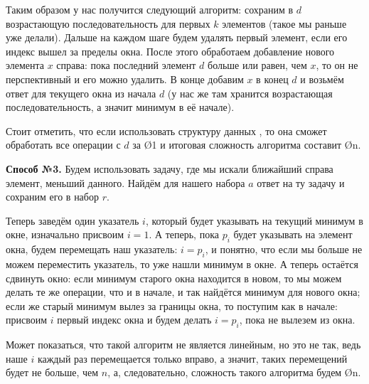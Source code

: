 Таким образом у нас получится следующий алгоритм: сохраним в $d$ возрастающую последовательность для первых $k$ элементов (такое мы раньше уже делали). Дальше на каждом шаге будем удалять первый элемент, если его индекс вышел за пределы окна. После этого обработаем добавление нового элемента $x$ справа: пока последний элемент $d$ больше или равен, чем $x$, то он не перспективный и его можно удалить. В конце добавим $x$ в конец $d$ и возьмём ответ для текущего окна из начала $d$ (у нас же там хранится возрастающая последовательность, а значит минимум в её начале).

Стоит отметить, что если использовать структуру данных , то она сможет обработать все операции с $d$ за \O{1} и итоговая сложность алгоритма составит \O{n}.

\textbf{Способ №3.} Будем использовать задачу, где мы искали ближайший справа элемент, меньший данного. Найдём для нашего набора $a$ ответ на ту задачу и сохраним его в набор $r$.

Теперь заведём один указатель $i$, который будет указывать на текущий минимум в окне, изначально присвоим $i = 1$. А теперь, пока $p_i$ будет указывать на элемент окна, будем перемещать наш указатель: $i = p_i$, и понятно, что если мы больше не можем переместить указатель, то уже нашли минимум в окне. А теперь остаётся сдвинуть окно: если минимум старого окна находится в новом, то мы можем делать те же операции, что и в начале, и так найдётся минимум для нового окна; если же старый минимум вылез за границы окна, то поступим как в начале: присвоим $i$ первый индекс окна и будем делать $i = p_i$, пока не вылезем из окна.

Может показаться, что такой алгоритм не является линейным, но это не так, ведь наше $i$ каждый раз перемещается только вправо, а значит, таких перемещений будет не больше, чем $n$, а, следовательно, сложность такого алгоритма будем \O{n}.
